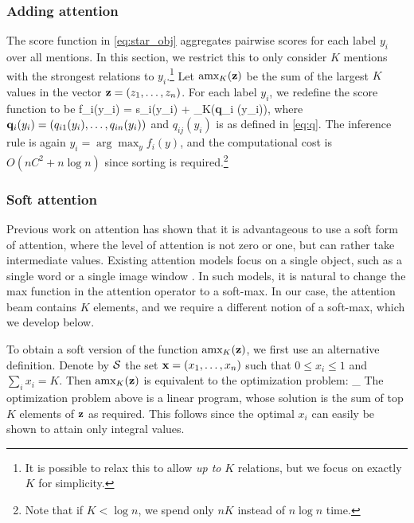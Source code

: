  

\subsubsection{Adding attention \label{sec:add_attention}}
The score function in \eqref{eq:star_obj} aggregates pairwise scores for each label $y_i$ over all mentions. In this section, we restrict this to only consider $K$ mentions with the strongest relations to $y_i$.\footnote{It is possible to relax this to allow {\em up to} $K$ relations, but we focus on exactly $K$ for simplicity.} 
  Let $\text{amx}_K({\bf z})$  be the sum of the largest $K$ values in the vector
${\bf z} = (z_1,\ldots,z_n)$.  For each label $y_i$,
we redefine the score function to be
\be
f_i(y_i) = s_i(y_i) + \amax_K({\bf q}_i (y_i)),
\label{eq:amax_obj}
\ee
where ${\bf q}_i(y_i) = (q_{i1}(y_i), \ldots, q_{in}(y_i))$ and $q_{ij}(y_i)$ is as defined in \eqref{eq:q}.
The inference rule is again $y_i = \arg\max_y f_i(y)$, and the computational cost is $O(nC^2+ n\log{n})$ since sorting is required.\footnote{Note that if $K < \log{n}$, we spend only $nK$ instead of $n\log{n}$ time.}


\subsubsection{Soft attention}
\label{sec:soft_attention}

Previous work on attention has shown that it is advantageous to use a soft form of attention, where the level of attention is not zero or one, but can rather take intermediate values. Existing attention models focus on a single object, such as a single word \cite{bahdanau2014neural} or a single image window \cite{xu2015show}. In such models,
 it is natural to change the max function in the attention operator to a soft-max. In our case, the attention beam contains $K$ elements, and we require a different notion of a soft-max, which we develop below.

\newcommand{\cS}{{\cal S}}
\newcommand{\xx}{{\mathbf{x}}}
\newcommand{\zz}{{\mathbf{z}}}
To obtain a soft version of the function  $\text{amx}_K({\bf z})$, we first use an alternative definition. Denote by $\cS$
the set ${\bf x} = (x_1,\ldots,x_n)$ such that $0\leq x_i \leq 1$ and $\sum_i x_i = K$. Then $\text{amx}_K({\bf z})$ is equivalent to the optimization problem:
\be
 \max_{ 
 \xx \in \cS
 }  
\ee
The optimization problem above is a linear program, whose solution is the sum of top $K$ elements of ${\bf z}$ as required. This follows since the optimal $x_i$ can easily be shown to attain only integral values. %

